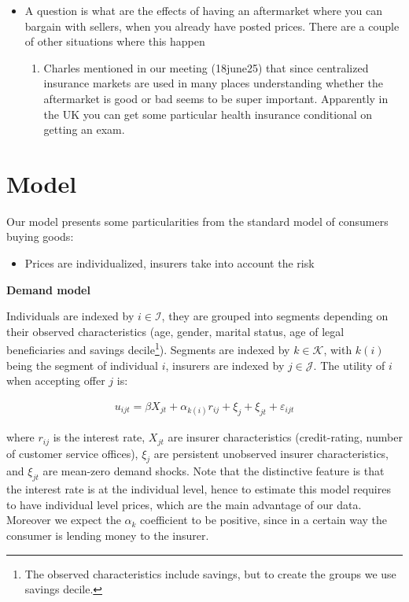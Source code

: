 \documentclass[12pt]{article}
\theoremstyle{plain}
\theoremstyle{plain}
\begin{document}
\begin{itemize}
    \item A question is what are the effects of having an aftermarket where you can bargain with sellers, when you already have posted prices. There are a couple of other situations where this happen 
    \begin{enumerate}
        \item Charles mentioned in our meeting (18june25) that since centralized insurance markets are used in many places understanding whether the aftermarket is good or bad seems to be super important. Apparently in the UK you can get some particular health insurance conditional on getting an exam.
    \end{enumerate}
    
\end{itemize}

\section{Model}
Our model presents some particularities from the standard model of consumers buying goods:
\begin{itemize}
    \item Prices are individualized, insurers take into account the  risk
\end{itemize}

\textbf{Demand model}
 
Individuals are indexed by $i\in \mathcal{I}$, they are grouped into segments depending on their observed characteristics (age, gender, marital status, age of legal beneficiaries and savings decile\footnote{The observed characteristics include savings, but to create the groups we use savings decile.}). Segments are indexed by $k \in \mathcal{K}$, with $k(i)$ being the segment of individual $i$, insurers are indexed by $j\in \mathcal{J}$.  The utility of $i$ when accepting offer $j$ is: 

\begin{align*}\label{eq:utility}
   u_{ijt} = \beta X_{jt}+ \alpha_{k(i)} r_{ij} + \xi_j +\xi_{jt} + \varepsilon_{ijt}   
\end{align*}

where $r_{ij}$ is the interest rate, $X_{jt}$  are insurer characteristics (credit-rating, number of customer service offices), $\xi_j$ are persistent unobserved insurer characteristics, and  $\xi_{jt}$ are mean-zero demand shocks.  
Note that the distinctive feature is that the interest rate is at the individual level, hence to estimate this model requires to have individual level prices, which are the main advantage of our data. Moreover we expect the $\alpha_k$ coefficient to be positive, since in a certain way the consumer is lending money to the insurer. 
\end{document}
